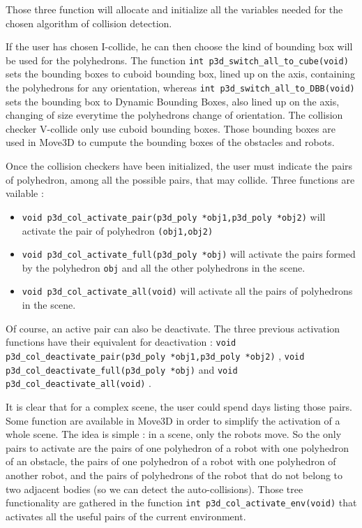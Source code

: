 Those three function will allocate and initialize all the variables
needed for the chosen algorithm of collision detection.

If the user has chosen I-collide, he can then choose the kind of
bounding box will be used for the polyhedrons. The function {\tt int
p3d\_switch\_all\_to\_cube(void)} 
sets the bounding boxes to cuboid bounding box, lined up on the axis,
containing the polyhedrons for any orientation, whereas {\tt int
p3d\_switch\_all\_to\_DBB(void)}  sets the bounding box to Dynamic
Bounding Boxes, also lined up on the axis, changing of size
everytime the polyhedrons change of orientation. The collision checker
V-collide only use cuboid bounding boxes. Those bounding boxes are
used in Move3D to cumpute the bounding boxes of the obstacles and robots.

Once the collision checkers have been initialized, the user must
indicate the pairs of polyhedron, among all the possible pairs, that
may collide. Three functions are vailable :

\begin{itemize}
\item {\tt void p3d\_col\_activate\_pair(p3d\_poly *obj1,p3d\_poly
*obj2)}  will activate the pair of polyhedron {\tt (obj1,obj2)}
\item {\tt void p3d\_col\_activate\_full(p3d\_poly *obj)}
 will activate
the pairs formed by the polyhedron {\tt obj} and all the other
polyhedrons in the scene.
\item {\tt void p3d\_col\_activate\_all(void)}
 will activate all the
pairs of polyhedrons in the scene.
\end{itemize}

Of course, an active pair can also be deactivate. The three previous
activation functions have their equivalent for deactivation : 
{\tt void p3d\_col\_deactivate\_pair(p3d\_poly *obj1,p3d\_poly *obj2)}
, 
{\tt void p3d\_col\_deactivate\_full(p3d\_poly *obj)}
 and 
{\tt void p3d\_col\_deactivate\_all(void)}
.

It is clear that for a complex scene, the user could spend days
listing those pairs. Some function are available in Move3D in order to
simplify the activation of a whole scene. The idea is simple : in a
scene, only the robots move. So the only pairs to activate are the
pairs of one polyhedron of a robot with one polyhedron of an
obstacle, the pairs of one polyhedron of a robot with one polyhedron
of another robot, and the pairs of polyhedrons of the robot that do
not belong to two adjacent bodies (so we can detect the auto-collisions).
Those tree functionality are gathered in the function {\tt int
p3d\_col\_activate\_env(void)}  that
activates all the useful pairs of the current environment. 

